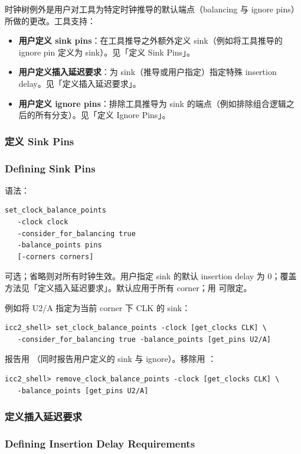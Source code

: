 时钟树例外是用户对工具为特定时钟推导的默认端点（balancing 与 ignore pins）所做的更改。工具支持：
\begin{itemize}
  \item \textbf{用户定义 sink pins}：在工具推导之外额外定义 sink（例如将工具推导的 ignore pin 定义为 sink）。见「定义 Sink Pins」。
  \item \textbf{用户定义插入延迟要求}：为 sink（推导或用户指定）指定特殊 insertion delay。见「定义插入延迟要求」。
  \item \textbf{用户定义 ignore pins}：排除工具推导为 sink 的端点（例如排除组合逻辑之后的所有分支）。见「定义 Ignore Pins」。
\end{itemize}

\subsubsection{定义 Sink Pins}
\subsubsection*{Defining Sink Pins}

语法：
\begin{lstlisting}
set_clock_balance_points
   -clock clock
   -consider_for_balancing true
   -balance_points pins
   [-corners corners]
\end{lstlisting}

 可选；省略则对所有时钟生效。用户指定 sink 的默认 insertion delay 为 0；覆盖方法见「定义插入延迟要求」。默认应用于所有 corner；用  可限定。

例如将 U2/A 指定为当前 corner 下 CLK 的 sink：
\begin{lstlisting}
icc2_shell> set_clock_balance_points -clock [get_clocks CLK] \
   -consider_for_balancing true -balance_points [get_pins U2/A]
\end{lstlisting}

报告用 （同时报告用户定义的 sink 与 ignore）。移除用 ：
\begin{lstlisting}
icc2_shell> remove_clock_balance_points -clock [get_clocks CLK] \
   -balance_points [get_pins U2/A]
\end{lstlisting}

\subsubsection{定义插入延迟要求}
\subsubsection*{Defining Insertion Delay Requirements}

